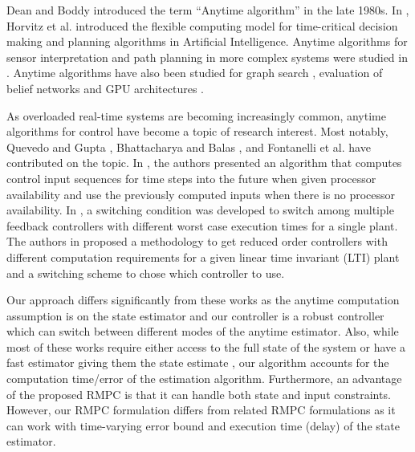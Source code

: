 

Dean and Boddy \cite{boddy} introduced the term ``Anytime algorithm'' in the late 1980s. In \cite{horvitz}, Horvitz et al. introduced the flexible computing model for time-critical decision making and planning algorithms in Artificial Intelligence. Anytime algorithms for sensor interpretation and path planning in more complex systems were studied in \cite{zilberstein, planningalgorithms}. Anytime algorithms have also been studied for graph search \cite{maxim}, evaluation of belief networks \cite{wellman} and GPU architectures \cite{RTSSanytime}.

As overloaded real-time systems are becoming increasingly common, anytime algorithms for control have become a topic of research interest. Most notably, Quevedo and Gupta \cite{sequence}, Bhattacharya and Balas \cite{balas}, and Fontanelli et al. \cite{fontanelli} have contributed on the topic. In \cite{sequence}, the authors presented an algorithm that computes control input sequences for time steps into the future when given processor availability and use the previously computed inputs when there is no processor availability.
In \cite{fontanelli}, a switching condition was developed to switch among multiple feedback controllers with different worst case execution times for a single plant.
The authors in \cite{balas} proposed a methodology to get reduced order controllers with different computation requirements for a given linear time invariant (LTI) plant and a switching scheme to chose which controller to use.

Our approach differs significantly from these works as the anytime computation assumption is on the state estimator and our controller is a robust controller which can switch between different modes of the anytime estimator.
Also, while most of these works require either access to the full state of the system or have a fast estimator giving them the state estimate \cite{balas}, our algorithm accounts for the computation time/error of the estimation algorithm.
Furthermore, an advantage of the proposed RMPC is that it can handle both state and input constraints.
However, our RMPC formulation differs from related RMPC formulations \cite{chiscietal01swp,richardsetal05rmp} as it can work with time-varying error bound and execution time (delay) of the state estimator.


